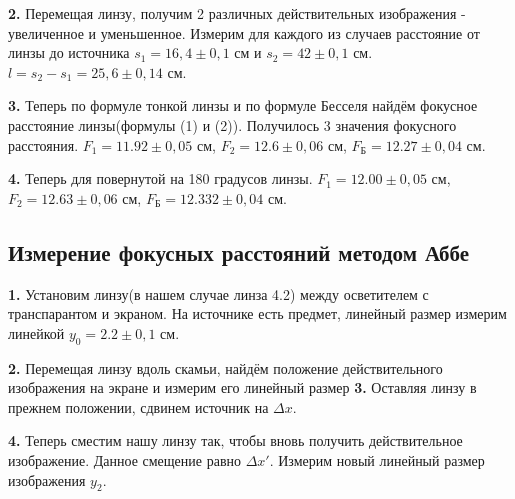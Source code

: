 \documentclass[a4paper,12pt]{article}
\begin{document}
\textbf{2.} Перемещая линзу, получим 2 различных действительных изображения - увеличенное и уменьшенное. Измерим для каждого из случаев расстояние от линзы до источника $s_1 = 16,4 \pm 0,1$ см и $s_2 = 42 \pm 0,1$ см. $l = s_2 - s_1 = 25,6 \pm 0,14$ см.

\textbf{3.} Теперь по формуле тонкой линзы и по формуле Бесселя найдём фокусное расстояние линзы(формулы (1) и (2)). Получилось 3 значения фокусного расстояния.
$F_1 = 11.92 \pm 0,05$ см, $F_2 = 12.6 \pm 0,06$ см, $F_\text{Б} = 12.27 \pm 0,04$ см.

\textbf{4.} Теперь для повернутой на 180 градусов линзы.
$F_1 = 12.00 \pm 0,05$ см, $F_2 = 12.63 \pm 0,06$ см, $F_\text{Б} = 12.332 \pm 0,04$ см.
\subsection*{Измерение фокусных расстояний методом Аббе}
\textbf{1.} Установим линзу(в нашем случае линза 4.2) между осветителем с транспарантом и экраном. На источнике есть предмет, линейный размер измерим линейкой $y_0 = 2.2 \pm 0,1$ см. 

\textbf{2.} Перемещая линзу вдоль скамьи, найдём положение действительного изображения на экране и измерим его линейный размер
\textbf{3.} Оставляя линзу в прежнем положении, сдвинем источник на $\Delta x$. 

\textbf{4.} Теперь сместим нашу линзу так, чтобы вновь получить действительное изображение. Данное смещение равно $\Delta x'$. Измерим новый линейный размер изображения $y_2$.
\end{document}

